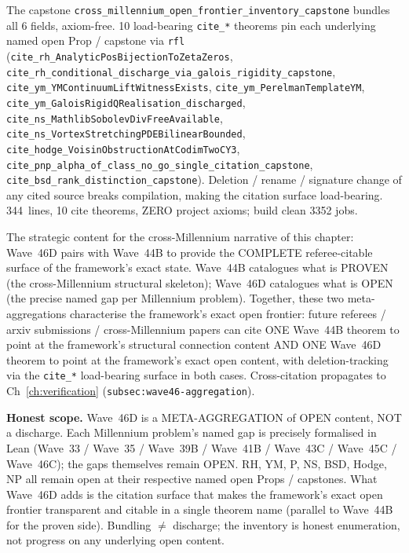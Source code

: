\begin{remark}
\begin{itemize}
  The capstone \texttt{cross\_millennium\_open\_frontier\_inventory\_capstone} bundles all 6 fields, axiom-free. 10 load-bearing \texttt{cite\_*} theorems pin each underlying named open Prop / capstone via \texttt{rfl} (\texttt{cite\_rh\_AnalyticPosBijectionToZetaZeros}, \texttt{cite\_rh\_conditional\_discharge\_via\_galois\_rigidity\_capstone}, \texttt{cite\_ym\_YMContinuumLiftWitnessExists}, \texttt{cite\_ym\_PerelmanTemplateYM}, \texttt{cite\_ym\_GaloisRigidQRealisation\_discharged}, \texttt{cite\_ns\_MathlibSobolevDivFreeAvailable}, \texttt{cite\_ns\_VortexStretchingPDEBilinearBounded}, \texttt{cite\_hodge\_VoisinObstructionAtCodimTwoCY3}, \texttt{cite\_pnp\_alpha\_of\_class\_no\_go\_single\_citation\_capstone}, \texttt{cite\_bsd\_rank\_distinction\_capstone}). Deletion / rename / signature change of any cited source breaks compilation, making the citation surface load-bearing. 344~lines, 10 cite theorems, ZERO project axioms; build clean 3352 jobs.
\end{itemize}
The strategic content for the cross-Millennium narrative of this chapter: Wave~46D pairs with Wave~44B to provide the COMPLETE referee-citable surface of the framework's exact state. Wave~44B catalogues what is PROVEN (the cross-Millennium structural skeleton); Wave~46D catalogues what is OPEN (the precise named gap per Millennium problem). Together, these two meta-aggregations characterise the framework's exact open frontier: future referees / arxiv submissions / cross-Millennium papers can cite ONE Wave~44B theorem to point at the framework's structural connection content AND ONE Wave~46D theorem to point at the framework's exact open content, with deletion-tracking via the \texttt{cite\_*} load-bearing surface in both cases. Cross-citation propagates to Ch~\ref{ch:verification} (\texttt{subsec:wave46-aggregation}).

\textbf{Honest scope.} Wave~46D is a META-AGGREGATION of OPEN content, NOT a discharge. Each Millennium problem's named gap is precisely formalised in Lean (Wave~33 / Wave~35 / Wave~39B / Wave~41B / Wave~43C / Wave~45C / Wave~46C); the gaps themselves remain OPEN. RH, YM, P, NS, BSD, Hodge, NP all remain open at their respective named open Props / capstones. What Wave~46D adds is the citation surface that makes the framework's exact open frontier transparent and citable in a single theorem name (parallel to Wave~44B for the proven side). Bundling $\neq$ discharge; the inventory is honest enumeration, not progress on any underlying open content.
\end{remark}

